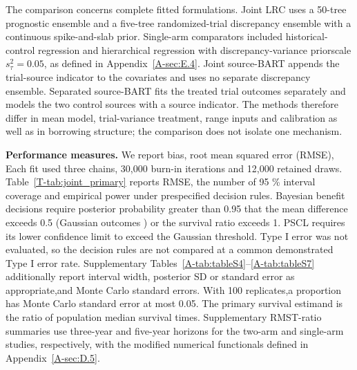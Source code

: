 \documentclass[11pt]{article}
\theoremstyle{remark}\newtheorem{remark}{Remark}[section]
\providecommand{\DIFaddtex}[1]{{\protect\color{blue} \sf #1}} %
\providecommand{\DIFdeltex}[1]{{\protect\color{red} \scriptsize #1}} %
\providecommand{\DIFaddbegin}{} %
\providecommand{\DIFaddend}{} %
\providecommand{\DIFdelbegin}{} %
\providecommand{\DIFdelend}{} %
\providecommand{\DIFadd}[1]{\texorpdfstring{\DIFaddtex{#1}}{#1}} %
\providecommand{\DIFdel}[1]{\texorpdfstring{\DIFdeltex{#1}}{}} %
\begin{document}
\DIFadd{The comparison concerns complete fitted formulations. Joint LRC uses a 50-tree prognostic ensemble and a five-tree randomized-trial discrepancy ensemble with a continuous spike-and-slab prior}\DIFaddend . \DIFdelbegin \DIFdel{Single-arm comparators included historical-control regression and hierarchical regression with discrepancy-variance priorscale $s_\tau^2=0.05$, as defined in Appendix~\ref{A-sec:E.4}. }\DIFdelend \DIFaddbegin \DIFadd{Joint source-BART appends the trial-source indicator to the covariates and uses no separate discrepancy ensemble. Separated source-BART fits the treated trial outcomes separately and models the two control sources with a source indicator. The methods therefore differ in mean model, trial-variance treatment, range inputs and calibration as well as in borrowing structure; the comparison does not isolate one mechanism.
}\DIFaddend 

\DIFdelbegin %
\DIFdel{\textbf{Performance measures.}
We report bias, root mean squared error (RMSE), }\DIFdelend \DIFaddbegin \DIFadd{Each fit used three chains, 30,000 burn-in iterations and 12,000 retained draws. Table~\ref{T-tab:joint_primary} reports RMSE, the number of }\DIFaddend 95\DIFdelbegin \DIFdel{\% interval coverage and empirical power under prespecified decision rules. Bayesian benefit decisions require posterior probability greater than 0.95 that the mean difference exceeds 0.5 (Gaussian outcomes ) or the survival ratio exceeds 1. PSCL requires its lower confidence limit to exceed the Gaussian threshold. Type I error was not evaluated, so the decision rules are not compared at a common demonstrated Type I error rate.
Supplementary Tables~\ref{A-tab:tableS4}--\ref{A-tab:tableS7} additionally report interval width, posterior SD or standard error as appropriate,and Monte Carlo standard errors. With 100 replicates,a proportion has Monte Carlo standard error at most 0.05. The primary survival estimand is the ratio of population median survival times. Supplementary RMST-ratio summaries use three-year and five-year horizons for the two-arm and single-arm studies, respectively, with the modified numerical functionals defined in Appendix~\ref{A-sec:D.5}. }%

\end{document}
